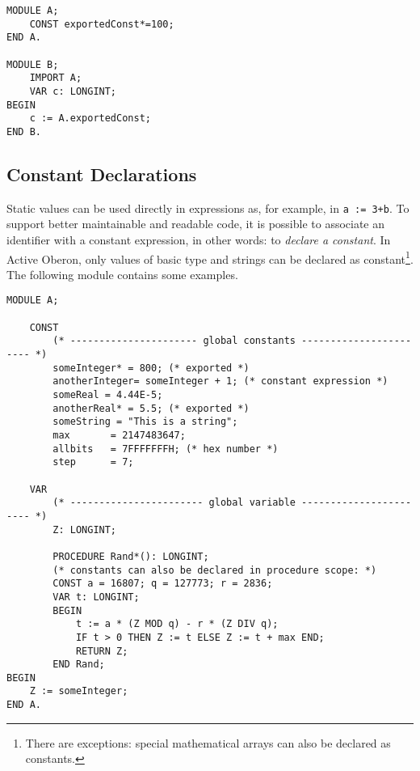 \documentclass[a4paper,11pt]{article}
\begin{document}
\begin{lstlisting}[language=Oberon,frame=none,caption={B imports A}]
MODULE A;
    CONST exportedConst*=100;
END A.

MODULE B;
    IMPORT A;
    VAR c: LONGINT;
BEGIN
    c := A.exportedConst;
END B.
\end{lstlisting}

\subsection{Constant Declarations}
Static values can be used directly in expressions as, for example, in \verb~a := 3+b~. To support better maintainable and readable code, it is possible to associate an identifier with a constant expression, in other words: to {\em declare a constant}. In Active Oberon, only values of basic type and strings can be declared as constant\footnote{There are exceptions: special mathematical arrays can also be declared as constants.}. The following module contains some examples.

\begin{lstlisting}[language=Oberon,frame=none,caption={Declaration and Usage of Constants}]
MODULE A;

    CONST
        (* ---------------------- global constants ----------------------- *)
        someInteger* = 800; (* exported *)
        anotherInteger= someInteger + 1; (* constant expression *)
        someReal = 4.44E-5;
        anotherReal* = 5.5; (* exported *)
        someString = "This is a string";
        max       = 2147483647;
        allbits   = 7FFFFFFFH; (* hex number *)
        step      = 7;

    VAR
        (* ----------------------- global variable ----------------------- *)
        Z: LONGINT;

        PROCEDURE Rand*(): LONGINT;
        (* constants can also be declared in procedure scope: *)
        CONST a = 16807; q = 127773; r = 2836;
        VAR t: LONGINT;
        BEGIN
            t := a * (Z MOD q) - r * (Z DIV q);
            IF t > 0 THEN Z := t ELSE Z := t + max END;
            RETURN Z;
        END Rand;
BEGIN
    Z := someInteger;
END A.
\end{lstlisting}
\end{document}
